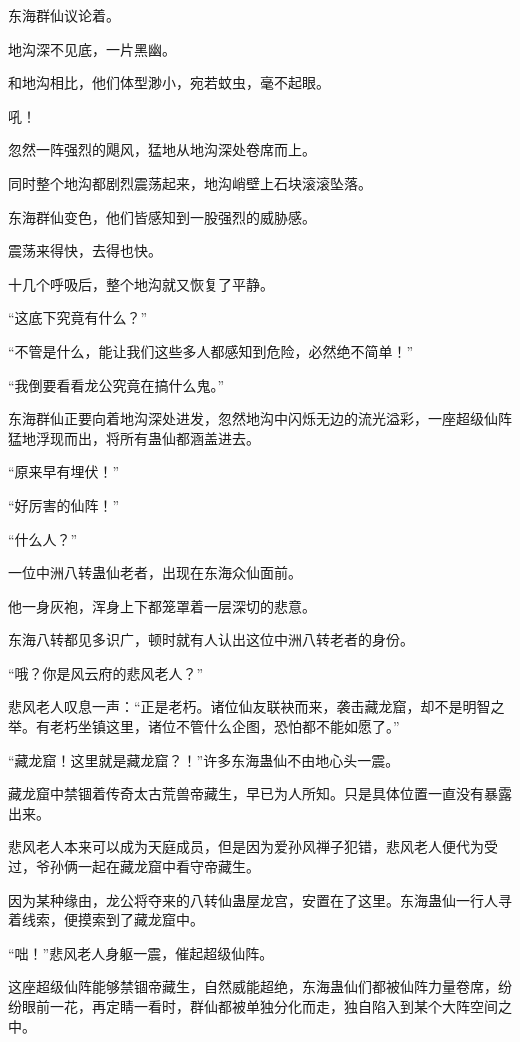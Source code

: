 \begin{this_body}
东海群仙议论着。

地沟深不见底，一片黑幽。

和地沟相比，他们体型渺小，宛若蚊虫，毫不起眼。

吼！

忽然一阵强烈的飓风，猛地从地沟深处卷席而上。

同时整个地沟都剧烈震荡起来，地沟峭壁上石块滚滚坠落。

东海群仙变色，他们皆感知到一股强烈的威胁感。

震荡来得快，去得也快。

十几个呼吸后，整个地沟就又恢复了平静。

“这底下究竟有什么？”

“不管是什么，能让我们这些多人都感知到危险，必然绝不简单！”

“我倒要看看龙公究竟在搞什么鬼。”

东海群仙正要向着地沟深处进发，忽然地沟中闪烁无边的流光溢彩，一座超级仙阵猛地浮现而出，将所有蛊仙都涵盖进去。

“原来早有埋伏！”

“好厉害的仙阵！”

“什么人？”

一位中洲八转蛊仙老者，出现在东海众仙面前。

他一身灰袍，浑身上下都笼罩着一层深切的悲意。

东海八转都见多识广，顿时就有人认出这位中洲八转老者的身份。

“哦？你是风云府的悲风老人？”

悲风老人叹息一声：“正是老朽。诸位仙友联袂而来，袭击藏龙窟，却不是明智之举。有老朽坐镇这里，诸位不管什么企图，恐怕都不能如愿了。”

“藏龙窟！这里就是藏龙窟？！”许多东海蛊仙不由地心头一震。

藏龙窟中禁锢着传奇太古荒兽帝藏生，早已为人所知。只是具体位置一直没有暴露出来。

悲风老人本来可以成为天庭成员，但是因为爱孙风禅子犯错，悲风老人便代为受过，爷孙俩一起在藏龙窟中看守帝藏生。

因为某种缘由，龙公将夺来的八转仙蛊屋龙宫，安置在了这里。东海蛊仙一行人寻着线索，便摸索到了藏龙窟中。

“咄！”悲风老人身躯一震，催起超级仙阵。

这座超级仙阵能够禁锢帝藏生，自然威能超绝，东海蛊仙们都被仙阵力量卷席，纷纷眼前一花，再定睛一看时，群仙都被单独分化而走，独自陷入到某个大阵空间之中。


\end{this_body}
